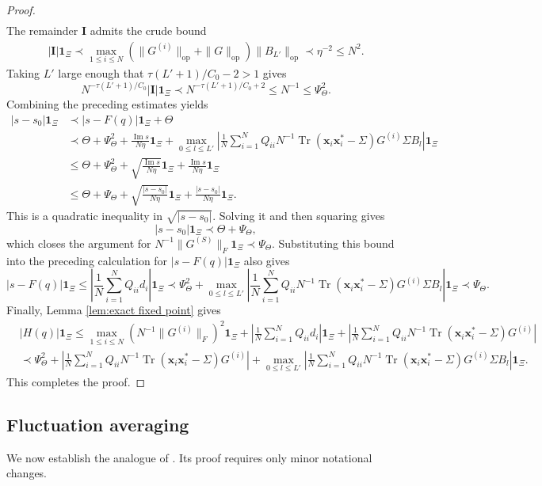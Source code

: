 \documentclass[11pt,reqno]{amsart}
\def\x{\mathbf{x}}
\def\1{\mathbf{1}}
\def\Im{\operatorname{Im}}
\def\op{\mathrm{op}}
\def\Tr{\operatorname{Tr}}
\theoremstyle{definition}
\numberwithin{equation}{section}
\numberwithin{figure}{section}
\begin{document}
\begin{proof}
\begin{align*}
\end{align*}
The remainder $\mathbf{I}$ admits the crude bound
\begin{align*}
    |\mathbf{I}|\1_\Xi\prec \max_{1\leq i\leq N}(\|G^{(i)}\|_\op+\|G\|_\op)\|B_{L'}\|_\op\prec \eta^{-2}\leq N^2.
\end{align*}
Taking $L'$ large enough that $\tau(L'+1)/C_0-2>1$ gives
\[
    N^{-\tau(L'+1)/C_0}|\mathbf{I}|\1_\Xi\prec N^{-\tau(L'+1)/C_0+2}\leq N^{-1}\leq \Psi_\Theta^2.
\]
Combining the preceding estimates yields
\begin{align*}
    |s-s_0|\1_\Xi
    &\prec |s-F(q)|\1_\Xi+\Theta\\
    &\prec \Theta+\Psi_\Theta^2+\frac{\Im s}{N\eta}\1_\Xi
      +\max_{0\leq l\leq L'}\left|\frac{1}{N}\sum_{i=1}^NQ_{ii}N^{-1}\Tr(\x_i\x_i^*-\Sigma)G^{(i)}\Sigma B_l\right|\1_\Xi\\
    &\leq \Theta+\Psi_\Theta^2+\sqrt{\frac{\Im s}{N\eta}}\1_\Xi
      +\frac{\Im s}{N\eta}\1_\Xi\\
    &\leq \Theta+\Psi_\Theta+\sqrt{\frac{|s-s_0|}{N\eta}}\1_\Xi
      +\frac{|s-s_0|}{N\eta}\1_\Xi.
\end{align*}
This is a quadratic inequality in $\sqrt{|s-s_0|}$. Solving it and then squaring gives
\[
    |s-s_0|\1_\Xi\prec \Theta+\Psi_\Theta,
\]
which closes the argument for $N^{-1}\|G^{(S)}\|_F\1_\Xi\prec \Psi_\Theta$. Substituting this bound into the preceding calculation for $|s-F(q)|\1_\Xi$ also gives
\[
    |s-F(q)|\1_\Xi\leq \left|\frac{1}{N}\sum_{i=1}^NQ_{ii}d_i\right|\1_\Xi\prec \Psi_\Theta^2+\max_{0\leq l\leq L'}\left|\frac{1}{N}\sum_{i=1}^NQ_{ii}N^{-1}\Tr(\x_i\x_i^*-\Sigma)G^{(i)}\Sigma B_l\right|\1_\Xi \prec \Psi_\Theta.
\]
Finally, Lemma \ref{lem:exact fixed point} gives
\begin{align*}
    &|H(q)|\1_\Xi\leq \max_{1\leq i\leq N}(N^{-1}\|G^{(i)}\|_F)^2\1_\Xi+\left|\frac{1}{N}\sum_{i=1}^NQ_{ii}d_i\right|\1_\Xi+\left|\frac{1}{N}\sum_{i=1}^NQ_{ii}N^{-1}\Tr(\x_i\x_i^*-\Sigma)G^{(i)}\right|\\
    &\prec \Psi_\Theta^2+\left|\frac{1}{N}\sum_{i=1}^NQ_{ii}N^{-1}\Tr(\x_i\x_i^*-\Sigma)G^{(i)}\right|+\max_{0\leq l\leq L'}\left|\frac{1}{N}\sum_{i=1}^NQ_{ii}N^{-1}\Tr(\x_i\x_i^*-\Sigma)G^{(i)}\Sigma B_l\right|\1_\Xi.
\end{align*}
This completes the proof.
\end{proof}

\subsection{Fluctuation averaging}
We now establish the analogue of \cite[Lemma 3.4]{fan2026anisotropic}. Its proof requires only minor notational changes.
\end{document}
